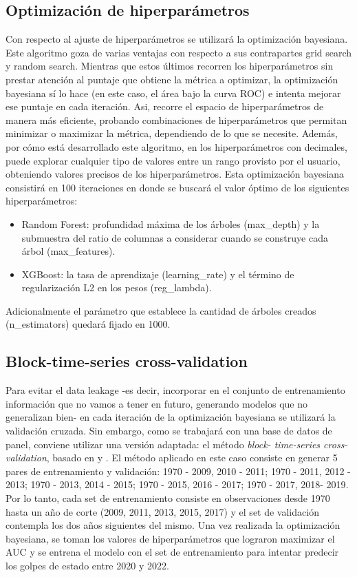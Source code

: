 \documentclass{article}
\begin{document}
\subsection{Optimización de hiperparámetros}
Con respecto al ajuste de hiperparámetros se utilizará la optimización bayesiana. Este
algoritmo goza de varias ventajas con respecto a sus contrapartes grid search y random
search. Mientras que estos últimos recorren los hiperparámetros
sin prestar atención al puntaje que obtiene la métrica a optimizar, la optimización bayesiana
sí lo hace (en este caso, el área bajo la curva ROC) e intenta mejorar ese puntaje en cada iteración. 
Asi, recorre el espacio de hiperparámetros de manera más eficiente,
probando combinaciones de hiperparámetros que permitan minimizar o maximizar la métrica, dependiendo
de lo que se necesite.
Además, por cómo está desarrollado este algoritmo, en los hiperparámetros con decimales, puede
explorar cualquier tipo de valores entre un rango provisto por el usuario, obteniendo valores
precisos de los hiperparámetros. Esta optimización bayesiana consistirá en 100 
iteraciones en donde se buscará el valor óptimo de los siguientes hiperparámetros:

\begin{itemize}
  \item Random Forest: profundidad máxima de los árboles (max\_depth) y la 
  submuestra del ratio de columnas a considerar cuando se construye cada árbol 
  (max\_features).
  \item XGBoost: la tasa de aprendizaje (learning\_rate) y el término de 
  regularización L2 en los pesos (reg\_lambda).
\end{itemize}

Adicionalmente el parámetro que establece la cantidad de árboles creados 
(n\_estimators) quedará fijado en 1000.

\subsection{Block-time-series cross-validation}
Para evitar el data leakage -es decir, incorporar en el conjunto de entrenamiento
información que no vamos a tener en futuro, generando modelos que no generalizan bien- 
en cada iteración de la optimización bayesiana
se utilizará la validación cruzada. Sin embargo, como se trabajará con una base
de datos de panel, conviene utilizar una versión adaptada: el método \textit{block-
time-series cross-validation}, basado en \cite{Bur94} y \cite{RAc00}. El método 
aplicado en este caso consiste en generar 5 pares de entrenamiento y validación: 
{1970 - 2009, 2010 - 2011}; {1970 - 2011, 2012 - 2013}; {1970 - 2013, 2014 - 2015}; 
{1970 - 2015, 2016 - 2017}; {1970 - 2017, 2018- 2019}. Por lo tanto, cada set de 
entrenamiento consiste en observaciones desde 1970 hasta un año de corte (2009, 
2011, 2013, 2015, 2017) y el set de validación contempla los dos años siguientes 
del mismo. Una vez realizada la optimización bayesiana, se toman los valores de 
hiperparámetros que lograron maximizar el AUC y se entrena el modelo con el set de 
entrenamiento para intentar predecir los golpes de estado entre 2020 y 2022. 
\end{document}
